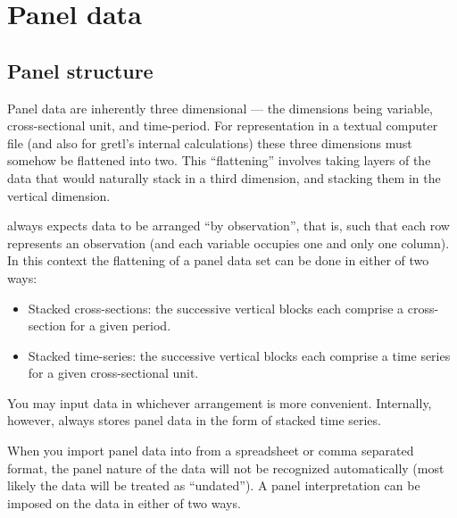 \chapter{Panel data}
\label{chap-panel}

\section{Panel structure}
\label{panel-structure}

Panel data are inherently three dimensional --- the dimensions being
variable, cross-sectional unit, and time-period.  For representation
in a textual computer file (and also for gretl's internal
calculations) these three dimensions must somehow be flattened into
two.  This ``flattening'' involves taking layers of the data that
would naturally stack in a third dimension, and stacking them in the
vertical dimension.

 always expects data to be arranged ``by observation'',
that is, such that each row represents an observation (and each
variable occupies one and only one column).  In this context the
flattening of a panel data set can be done in either of two ways:

\begin{itemize}
\item Stacked cross-sections: the successive vertical blocks each
  comprise a cross-section for a given period.
\item Stacked time-series: the successive vertical blocks each
  comprise a time series for a given cross-sectional unit.
\end{itemize}

You may input data in whichever arrangement is more convenient.
Internally, however,  always stores panel data in
the form of stacked time series.

When you import panel data into  from a spreadsheet or
comma separated format, the panel nature of the data will not be
recognized automatically (most likely the data will be treated as
``undated'').  A panel interpretation can be imposed on the data in
either of two ways.

